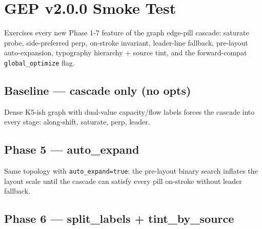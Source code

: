 \section{GEP v2.0.0 Smoke Test}

Exercises every new Phase 1-7 feature of the graph edge-pill cascade:
saturate probe, side-preferred perp, on-stroke invariant, leader-line
fallback, pre-layout auto-expansion, typography hierarchy + source
tint, and the forward-compat \texttt{global\_optimize} flag.

\subsection{Baseline — cascade only (no opts)}

Dense K5-ish graph with dual-value capacity/flow labels forces the
cascade into every stage: along-shift, saturate, perp, leader.

\begin{diagram}[id="gep-baseline", label="Cascade only"]
\end{diagram}

\subsection{Phase 5 — auto\_expand}

Same topology with \texttt{auto\_expand=true}: the pre-layout binary
search inflates the layout scale until the cascade can satisfy every
pill on-stroke without leader fallback.

\begin{diagram}[id="gep-auto-expand", label="auto\\_expand=true"]
\end{diagram}

\subsection{Phase 6 — split\_labels + tint\_by\_source}

